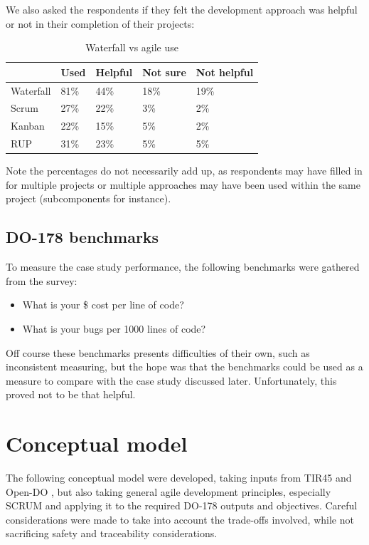 \documentclass{sig-alternate-05-2015}
\begin{document}
We also asked the respondents if they felt the development approach was helpful or not in their completion of their projects:

\begin{table}[]
	\centering
	\caption{Waterfall vs agile use}
	\label{Waterfall vs agile use}
	\begin{tabular}{l|llll}
		& Used & Helpful & Not sure & Not helpful \\ \hline
		Waterfall & 81\% & 44\%    & 18\%     & 19\%        \\
		Scrum     & 27\% & 22\%    & 3\%      & 2\%         \\
		Kanban    & 22\% & 15\%    & 5\%      & 2\%        	\\
		RUP       & 31\% & 23\%    & 5\%      & 5\% 
	\end{tabular}
\end{table}

Note the percentages do not necessarily add up, as respondents may have filled in for multiple projects or multiple approaches may have been used within the same project (subcomponents for instance).    

\subsection{DO-178 benchmarks}
To measure the case study performance, the following benchmarks were gathered from the survey:

\begin{itemize}
	\item What is your \$ cost per line of code?
	\item What is your bugs per 1000 lines of code?
\end{itemize}

Off course these benchmarks presents difficulties of their own, such as inconsistent measuring, but the hope was that the benchmarks could be used as a measure to compare with the case study discussed later. Unfortunately, this proved not to be that helpful.

\section{Conceptual model}

The following conceptual model were developed, taking inputs from TIR45 \cite{AAMI_TIR45_2012} and Open-DO \cite{OPEN-DO_2010}, but also taking general agile development principles, especially SCRUM and applying it to the required DO-178 outputs and objectives. Careful considerations were made to take into account the trade-offs involved, while not sacrificing safety and traceability considerations.
\end{document}
